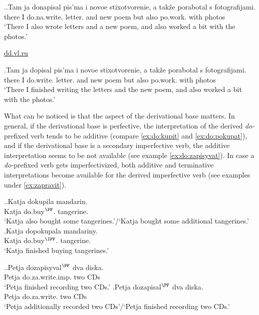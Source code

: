 \ex.\ag.\label{ex:donapisat}Tam ja donapisal pis'ma i novoe stixotvorenie, a tak\v{z}e porabotal s fotografijami.\\
there I do.na.write. letter. and new poem but also po.work. with photos\\
\vspace{0.5em}
`There I also wrote letters and a new poem, and also worked a bit with the photos.'
\begin{flushright}
\vspace{-0.5em}
\url{dd.vl.ru}
\end{flushright}
\bg.\label{ex:donapisat:mod}Tam ja dopisal pis'ma i novoe stixotvorenie, a tak\v{z}e porabotal s fotografijami.\\
there I do.write. letter. and new poem but also po.work. with photos\\
\vspace{0.5em}
`There I finished writing the letters and the new poem, and also worked a bit with the photos.'

What can be noticed is that the aspect of the derivational base matters. In general, if the derivational base is perfective, the interpretation of the derived \textit{do-}prefixed verb tends to be additive (compare \ref{ex:do:kupit} and \ref{ex:do:pokupat}), and if the derivational base is a secondary imperfective verb, the additive interpretation seems to be not available (see example \ref{ex:do:zapisyvat}). In case a \textit{do-}prefixed verb gets imperfectivized, both additive and terminative interpretations become available for the derived imperfective verb (see examples under \ref{ex:zapravit}).

\ex.\ag.\label{ex:do:kupit}Katja dokupila mandarin.\\
Katja do.buy$^{\PF}$. tangerine.\\
\vspace{0.5em}
`Katja also bought some tangerines.'/`Katja bought some additional tangerines.'
\bg.\label{ex:do:pokupat}Katja dopokupala mandariny.\\
Katja do.buy$^{\IPF}$. tangerine.\\
\vspace{0.5em}
`Katja finished buying tangerines.'

\ex.\ag.\label{ex:do:zapisyvat}Petja dozapisyval$^{\PF}$ dva diska.\\
Petja do.za.write.imp. two CDs\\
\vspace{0.5em}
`Petja finished recording two CDs.'
\bg.\label{ex:do:zapisat}Petja dozapisal$^{\PF}$ dva diska.\\
Petja do.za.write. two CDs\\
\vspace{0.5em}
`Petja additionally recorded two CDs'/`Petja finished recording two CDs.'

